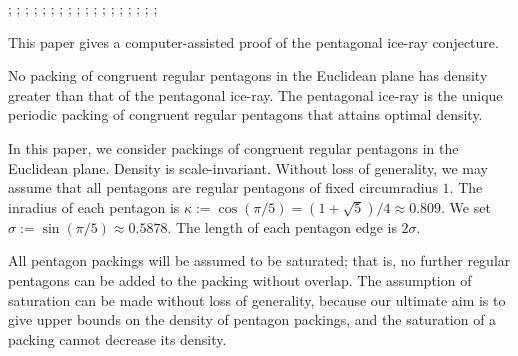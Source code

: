 {
;  %
;  %
;  
;  %
; 
;  
;  
;  %
; 
;  
;  
;  %
;  %
; 
;  %
; 
;  
;   
}



This paper gives a computer-assisted proof of the pentagonal ice-ray
conjecture.


\begin{theorem}  
  No packing of congruent regular pentagons in the Euclidean plane has
  density greater than that of the pentagonal ice-ray.  The pentagonal
  ice-ray is the unique periodic packing of congruent regular
  pentagons that attains optimal density.
\end{theorem}

In this paper, we consider packings of congruent regular pentagons in
the Euclidean plane.   Density is scale-invariant.  Without loss of generality,
we may assume that all pentagons are regular pentagons of fixed
circumradius $1$.  The inradius of each pentagon is $\kappa:= \cos
(\pi/5) = (1+\sqrt{5})/4 \approx 0.809$. We set $\sigma := \sin(\pi/5)
\approx 0.5878$.  The length of each pentagon edge is $2\sigma$.

All pentagon packings will be assumed to be saturated; that is, no
further regular pentagons can be added to the packing without overlap.
The assumption of saturation can be made without loss of generality,
because our ultimate aim is to give upper bounds on the density of
pentagon packings, and the saturation of a packing cannot decrease its
density.


